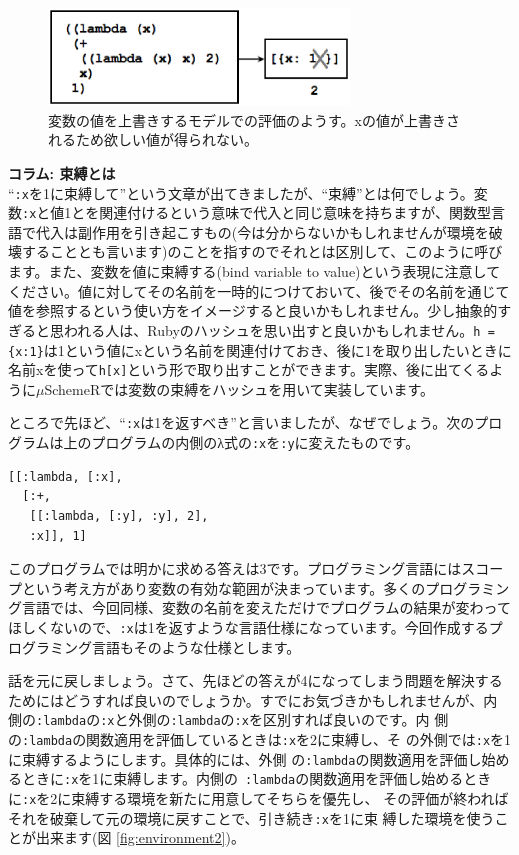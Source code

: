 \begin{figure}[htbp]
\begin{center}
\includegraphics[width=80mm]{images/environment1.eps}
\end{center}
\caption{変数の値を上書きするモデルでの評価のようす。xの値が上書きされるため欲しい値が得られない。}
\label{fig:environment1}
\end{figure}


\begin{boxnote}
{\bf コラム: 束縛とは} \\

“{\tt :x}を1に束縛して”という文章が出てきましたが、“束縛”とは何でしょう。変数{\tt :x}と値1とを関連付けるという意味で代入と同じ意味を持ちますが、関数型言語で代入は副作用を引き起こすもの(今は分からないかもしれませんが環境を破壊することとも言います)のことを指すのでそれとは区別して、このように呼びます。また、変数を値に束縛する(bind variable to value)という表現に注意してください。値に対してその名前を一時的につけておいて、後でその名前を通じて値を参照するという使い方をイメージすると良いかもしれません。少し抽象的すぎると思われる人は、Rubyのハッシュを思い出すと良いかもしれません。{\tt h = \{x:1\}}は1という値にxという名前を関連付けておき、後に1を取り出したいときに名前xを使って{\tt h[x]}という形で取り出すことができます。実際、後に出てくるように$\mu$SchemeRでは変数の束縛をハッシュを用いて実装しています。
\end{boxnote}

ところで先ほど、“{\tt :x}は1を返すべき”と言いましたが、なぜでしょう。次のプログラムは上のプログラムの内側のλ式の{\tt :x}を{\tt :y}に変えたものです。

\begin{lstlisting}
[[:lambda, [:x],
  [:+, 
   [[:lambda, [:y], :y], 2],
   :x]], 1]
\end{lstlisting}

このプログラムでは明かに求める答えは3です。プログラミング言語にはスコープという考え方があり変数の有効な範囲が決まっています。多くのプログラミング言語では、今回同様、変数の名前を変えただけでプログラムの結果が変わってほしくないので、{\tt :x}は1を返すような言語仕様になっています。今回作成するプログラミング言語もそのような仕様とします。

話を元に戻しましょう。さて、先ほどの答えが4になってしまう問題を解決する
ためにはどうすれば良いのでしょうか。すでにお気づきかもしれませんが、内
側の{\tt :lambda}の{\tt :x}と外側の{\tt :lambda}の{\tt :x}を区別すれば良いのです。内
側の{\tt :lambda}の関数適用を評価しているときは{\tt :x}を2に束縛し、そ
の外側では{\tt :x}を1に束縛するようにします。具体的には、外側
の{\tt :lambda}の関数適用を評価し始めるときに{\tt :x}を1に束縛します。内側の{\tt
:lambda}の関数適用を評価し始めるときに{\tt :x}を2に束縛する環境を新たに用意してそちらを優先し、
その評価が終わればそれを破棄して元の環境に戻すことで、引き続き{\tt :x}を1に束
縛した環境を使うことが出来ます(図 \ref{fig:environment2})。

